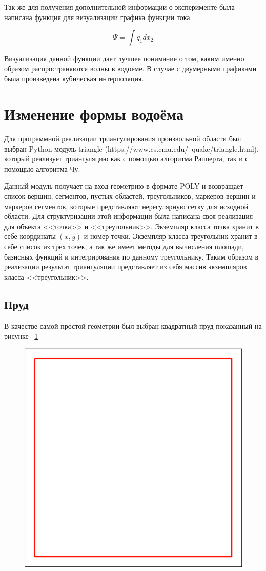 \documentclass[14pt]{extreport}
\begin{document}
Так же для получения дополнительной информации о эксперименте была написана функция для визуализации графика функции тока:

$$\Psi = \int q_1 dx_2$$

Визуализация данной функции дает лучшее понимание о том, каким именно образом распространяются волны в водоеме. В случае с двумерными графиками была произведена кубическая интерполяция.

\section{Изменение формы водоёма}

Для программной реализации триангулирования произвольной области был выбран Python модуль triangle (https://www.cs.cmu.edu/~quake/triangle.html), который реализует триангуляцию как с помощью алгоритма Рапперта, так и с помощью алгоритма Чу.

Данный модуль получает на вход геометрию в формате POLY и возвращает список вершин, сегментов, пустых областей, треугольников, маркеров вершин и маркеров сегментов, которые представляют нерегулярную сетку для исходной области. Для структуризации этой информации была написана своя реализация для объекта <<точка>> и <<треугольник>>. Экземпляр класса точка хранит в себе координаты $(x, y)$ и номер точки. Экземпляр класса треугольник хранит в себе список из трех точек, а так же имеет методы для вычисления площади, базисных функций и интегрирования по данному треугольнику. Таким образом в реализации результат триангуляции представляет из себя массив экземпляров класса <<треугольник>>.

\subsection{Пруд}

В качестве самой простой геометрии был выбран квадратный пруд  показанный на рисунке ~\ref{img:ex1:contour}

\begin{figure}[H]
\centerline{
\includegraphics[width=0.5\linewidth]{images/ex1/contour}}
\caption{}
\label{img:ex1:contour}
\end{figure}
\end{document}
